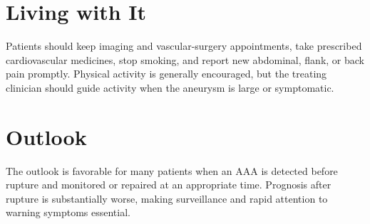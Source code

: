 \section{Living with It}
Patients should keep imaging and vascular-surgery appointments, take prescribed cardiovascular medicines, stop smoking, and report new abdominal, flank, or back pain promptly. Physical activity is generally encouraged, but the treating clinician should guide activity when the aneurysm is large or symptomatic.
\section{Outlook}
The outlook is favorable for many patients when an AAA is detected before rupture and monitored or repaired at an appropriate time. Prognosis after rupture is substantially worse, making surveillance and rapid attention to warning symptoms essential.
